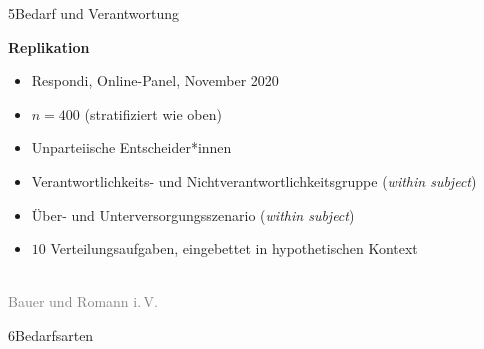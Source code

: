 \documentclass[xcolor=table,9pt,aspectratio=169]{beamer}
\begin{document}
\begin{frame}{\vspace*{10mm}5\hspace*{1em}Bedarf und Verantwortung}
\begin{multicols}{2}
   \textbf{Replikation}\\
   \medskip
   \begin{itemize}
      \item Respondi, Online-Panel, November 2020
      \item $n=400$ (stratifiziert wie oben)
      \item Unparteiische Entscheider*innen
      \item Verantwortlichkeits- und Nichtverantwortlichkeitsgruppe (\textit{within subject})
      \item Über- und Unterversorgungsszenario (\textit{within subject})
      \item $10$ Verteilungsaufgaben, eingebettet in hypothetischen Kontext
   \end{itemize}
   \vfill
   \begin{center}
      \\
      \textcolor{gray}{Bauer und Romann i.\,V.}
   \end{center}
\end{multicols}
\end{frame}


\begin{frame}
\begin{overlayarea}{\textwidth}{0.81\paperheight}{
   \vspace*{11mm}
   \textcolor{uolblue}
   {6\hspace*{1em}Bedarfsarten}
}
\end{overlayarea}
\end{frame}
\end{document}
